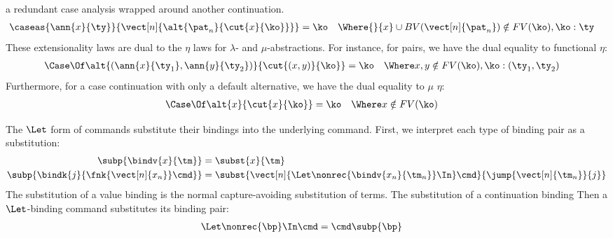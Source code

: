 \documentclass{article}
\begin{document}
a redundant case analysis wrapped around another continuation.
\begin{align*}
  \caseas{\ann{x}{\ty}}{\vect[n]{\alt{\pat_n}{\cut{x}{\ko}}}}
  &=
  \ko
  &
  \Where{}
  \{x\} \cup BV(\vect[n]{\pat_n}) &\notin FV(\ko)
  ,
  \ko : \ty
\end{align*}
These extensionality laws are dual to the $\eta$ laws for $\lambda$- and
$\mu$-abstractions.  For instance, for pairs, we have the dual equality to
functional $\eta$:
\begin{align*}
  \Case\Of \alt{(\ann{x}{\ty_1},\ann{y}{\ty_2})}{\cut{(x,y)}{\ko}}
  &=
  \ko
  &
  \Where
  x,y &\notin FV(\ko)
  ,
  \ko : (\ty_1, \ty_2)
\end{align*}
Furthermore, for a case continuation with only a default alternative, we have
the dual equality to $\mu$ $\eta$:
\begin{align*}
  \Case\Of \alt{x}{\cut{x}{\ko}}
  &=
  \ko
  &
  \Where
  x &\notin FV(\ko)
\end{align*}

The $\Let$ form of commands substitute their bindings into the underlying
command.  First, we interpret each type of binding pair as a substitution:
\begin{align*}
  \subp{\bindv{x}{\tm}} &= \subst{x}{\tm}
  \\
  \subp{\bindk{j}{\fnk{\vect[n]{x_n}}\cmd}}
  &=
  \subst{\vect[n]{\Let \nonrec{\bindv{x_n}{\tm_n}} \In} \cmd}{\jump{\vect[n]{\tm_n}}{j}}
\end{align*}
The substitution of a value binding is the normal capture-avoiding substitution
of terms.  The substitution of a continuation binding  Then a $\Let$-binding command substitutes its binding pair:
\begin{align*}
  \Let \nonrec{\bp} \In \cmd
  &=
  \cmd\subp{\bp}
\end{align*}
\end{document}

